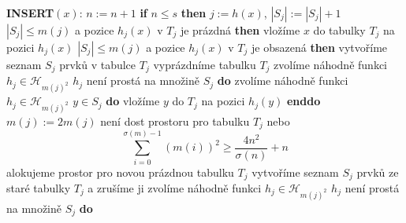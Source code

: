 \documentclass[a4paper,12pt]{article}
\begin{document}
{\bf INSERT$(x)$}: \newline 
$n:=n+1$ \newline 
{\bf if} $n\le s$ {\bf then}\newline 
\phantom{---}$j:=h(x)$, $|S_j|:=|S_j|+1$\newline 
\phantom{---}{\bf if} $|S_j|\le m(j)$ a pozice $h_j(x)$ v $T_j$ je prázdná {\bf then}\newline 
\phantom{------}vložíme $x$ do tabulky $T_j$  na pozici $
h_j(x)$\newline 
\phantom{---}{\bf else}\newline 
\phantom{------}{\bf if} $|S_j|\le m(j)$ a pozice $h_j(x)$ v $T_
j$ je obsazená {\bf then}\newline 
\phantom{---------}vytvoříme seznam $S_j$ prvků v tabulce $
T_j$\newline 
\phantom{---------}vyprázdníme tabulku $T_j$\newline 
\phantom{---------}zvolíme náhodně funkci $h_j\in \mathcal H_{
m(j)^2}$\newline 
\phantom{---------}{\bf while} $h_j$ není prostá na množině $
S_j$ {\bf do}\newline 
\phantom{------------}zvolíme náhodně funkci $h_j
\in \mathcal H_{m(j)^2}$\newline 
\phantom{---------}{\bf enddo}\newline 
{} $y\in S_j$ {\bf do} vložíme $
y$ do $T_j$ na pozici $h_j(y)$ {\bf enddo}\newline 
\phantom{------}{\bf else}\newline 
\phantom{---------}$m(j):=2m(j)$\newline 
\phantom{---------}{\bf if} není dost prostoru pro tabulku $
T_j$ nebo 
$$\sum_{i=0}^{\sigma (m)-1}(m(i))^2\ge\frac {4n^2}{\sigma (n)}+n$$
\phantom{---------}{\bf then}\newline 
\phantom{------------}{\bf RehashAll}\newline 
\phantom{---------}{\bf else}\newline 
\phantom{------------}alokujeme prostor pro novou prázdnou tabulku $
T_j$ \newline 
\phantom{------------}vytvoříme seznam $S_j$ prvků ze staré tabulky $
T_j$ a zrušíme ji\newline 
\phantom{------------}zvolíme náhodně funkci $h_j\in \mathcal H_{
m(j)^2}$\newline 
\phantom{------------}{\bf while} $h_j$ není prostá na množině $
S_j$ {\bf do}\newline 
\end{document}
